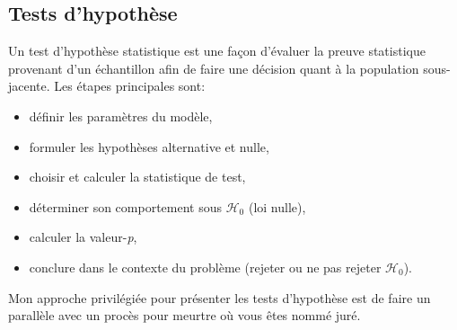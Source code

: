 \documentclass[
  11pt,
  letterpaper,
]{article}
\providecommand{\tightlist}{%
  \setlength{\itemsep}{0pt}\setlength{\parskip}{0pt}}
\theoremstyle{definition}
\theoremstyle{definition}
\theoremstyle{definition}
\theoremstyle{definition}
\theoremstyle{remark}
\begin{document}
\hypertarget{tests}{%
\subsection{Tests d'hypothèse}\label{tests}}

Un test d'hypothèse statistique est une façon d'évaluer la preuve statistique provenant d'un échantillon afin de faire une décision quant à la population sous-jacente. Les étapes principales sont:

\begin{itemize}
\tightlist
\item
  définir les paramètres du modèle,
\item
  formuler les hypothèses alternative et nulle,
\item
  choisir et calculer la statistique de test,
\item
  déterminer son comportement sous \(\mathscr{H}_0\) (loi nulle),
\item
  calculer la valeur-\emph{p},
\item
  conclure dans le contexte du problème (rejeter ou ne pas rejeter \(\mathscr{H}_0\)).
\end{itemize}

Mon approche privilégiée pour présenter les tests d'hypothèse est de faire un parallèle avec un procès pour meurtre où vous êtes nommé juré.
\end{document}
